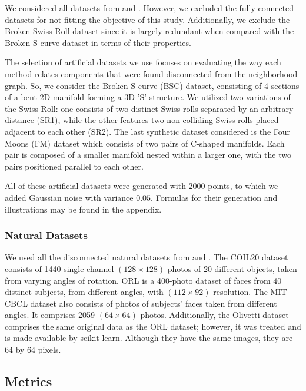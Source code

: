 \documentclass{article} %
\begin{document}
We considered all datasets from \citet{dr-review} and \citet{eng}. However, we excluded the fully connected datasets for not fitting the objective of this study. Additionally, we exclude the Broken Swiss Roll dataset since it is largely redundant when compared with the Broken S-curve dataset in terms of their properties.

The selection of artificial datasets we use focuses on evaluating the way each method relates components that were found disconnected from the neighborhood graph. So, we consider the Broken S-curve (BSC) dataset, consisting of 4 sections of a bent 2D manifold forming a 3D 'S' structure. We utilized two variations of the Swiss Roll: one consists of two distinct Swiss rolls separated by an arbitrary distance (SR1), while the other features two non-colliding Swiss rolls placed adjacent to each other (SR2). The last synthetic dataset considered is the Four Moons (FM) dataset which consists of two pairs of C-shaped manifolds. Each pair is composed of a smaller manifold nested within a larger one, with the two pairs positioned parallel to each other.

All of these artificial datasets were generated with 2000 points, to which we added Gaussian noise with variance $0.05$. Formulas for their generation and illustrations may be found in the appendix.

\subsubsection{Natural Datasets} \label{sec:datasets-natural}

We used all the disconnected natural datasets from \citet{dr-review} and \citet{eng}. The COIL20 dataset consists of 1440 single-channel $(128\times 128)$ photos of 20 different objects, taken from varying angles of rotation. ORL is a 400-photo dataset of faces from 40 distinct subjects, from different angles, with $(112\times 92)$ resolution. The MIT-CBCL dataset also consists of photos of subjects' faces taken from different angles. It comprises 2059 $(64\times64)$ photos. Additionally, the Olivetti dataset comprises the same original data as the ORL dataset; however, it was treated and is made available by scikit-learn. Although they have the same images, they are 64 by 64 pixels.

\subsection{Metrics} \label{sec:metrics}
\end{document}
